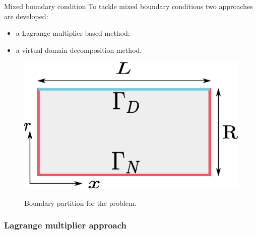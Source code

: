 \documentclass[aspectratio=169]{ISAE-Beamer}
\begin{document}
\begin{frame}{Mixed boundary condition}
To tackle mixed boundary conditions two approaches are developed:
\begin{itemize}
\item a Lagrange multiplier based method;
\item a virtual domain decomposition method.
\end{itemize} 	
\begin{figure}[b]%
\centering
\includegraphics[width=0.4\columnwidth]{presentation/vibroacoustic_boundary_part.eps} \\
\caption[bcpart]{Boundary partition for the problem.}
\end{figure}
\end{frame}


\subsubsection{Lagrange multiplier approach}
\end{document}
